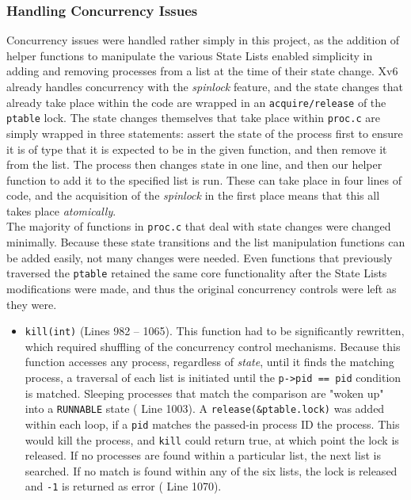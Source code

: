 \documentclass[11pt,letterpaper]{report}
\begin{document}
	\subsubsection{Handling Concurrency Issues}
	Concurrency issues were handled rather simply in this project, as the addition of helper functions to manipulate the various State Lists enabled simplicity in adding and removing processes from a list at the time of their state change. Xv6 already handles concurrency with the \emph{spinlock} feature, and the state changes that already take place within the code are wrapped in an {\tt acquire/release} of the {\tt ptable} lock. The state changes themselves that take place within {\tt proc.c} are simply wrapped in three statements: assert the state of the process first to ensure it is of type that it is expected to be in the given function, and then remove it from the list. The process then changes state in one line, and then our helper function to add it to the specified list is run. These can take place in four lines of code,  and the acquisition of the \emph{spinlock} in the first place means that this all takes place \emph{atomically}.\\
	The majority of functions in {\tt proc.c} that deal with state changes were changed minimally. Because these state transitions and the list manipulation functions can be added easily, not many changes were needed. Even functions that previously traversed the {\tt ptable} retained the same core functionality after the State Lists modifications were made, and thus the original concurrency controls were left as they were.
	\begin{itemize}
		\item {\tt kill(int)} ({\color{red}Lines 982 -- 1065}). This function had to be significantly rewritten, which required shuffling of the concurrency control mechanisms. Because this function accesses any process, regardless of \emph{state}, until it finds the matching process, a traversal of each list is initiated until the {\tt p->pid == pid} condition is matched. Sleeping processes that match the comparison are "woken up" into a {\tt RUNNABLE} state ({\color{red} Line 1003}). A {\tt release(\&ptable.lock)} was added within each loop, if a {\tt pid} matches the passed-in process ID the process. This would kill the process, and {\tt kill} could return true, at which point the lock is released. If no processes are found within a particular list, the next list is searched. If no match is found within any of the six lists, the lock is released and {\tt -1} is returned as error ({\color{red} Line 1070}).
	\end{itemize}
	
\end{document}
